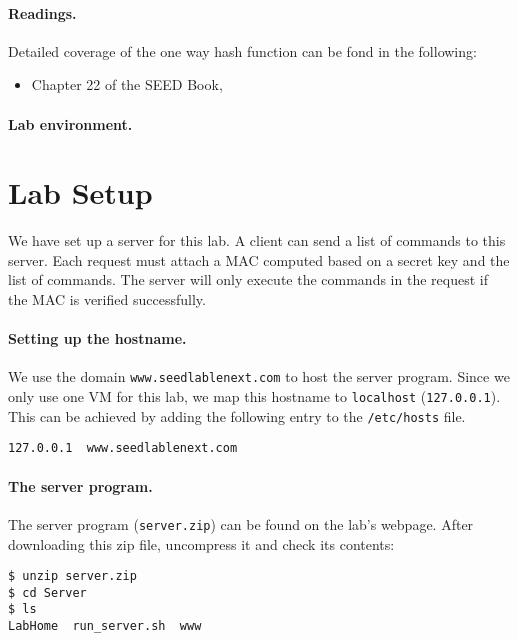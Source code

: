 \paragraph{Readings.} Detailed coverage of the one way hash function can be 
fond in the following: 

\begin{itemize}
\item Chapter 22 of the SEED Book, \seedbook
\end{itemize}


\paragraph{Lab environment.} \seedenvironment



\section{Lab Setup}

We have set up a server for this lab. 
A client can send a list of commands to this server. 
Each request must attach a MAC computed based on a secret
key and the list of commands. The server will 
only execute the commands in the request if 
the MAC is verified successfully. 

\paragraph{Setting up the hostname.}
We use the domain \texttt{www.seedlablenext.com} to host the server program. 
Since we only use one VM for this lab, we map this hostname to 
\texttt{localhost} (\texttt{127.0.0.1}). This can be
achieved by adding the following entry to the 
\texttt{/etc/hosts} file.

\begin{lstlisting}
127.0.0.1  www.seedlablenext.com
\end{lstlisting}


\paragraph{The server program.} The server program (\texttt{server.zip})
can be found on the lab's webpage. After downloading this zip file,
uncompress it and check its contents:

\begin{lstlisting}
$ unzip server.zip
$ cd Server
$ ls 
LabHome  run_server.sh  www
\end{lstlisting}

